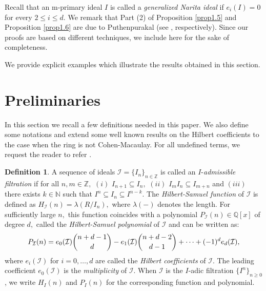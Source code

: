 \documentclass[reqno,a4paper,dvipsnames]{amsart}
\theoremstyle{definition}
\newtheorem{definition}[theorem]{Definition}
\begin{document}
Recall that an m-primary ideal $I$ is called a \textit{generalized Narita ideal} if $e_{i}(I)=0$
 for every $2\leq i\leq d$. We remark that Part (2) of Proposition \ref{prop1.5} and Proposition \ref{prop1.6} are due to Puthenpurakal (see  \cite[Theorem 1.1 (3) and Theorem 1.4]{tjp3}, respectively). Since our proofs are based on different techniques, we include here for the sake of completeness.
 
We provide  explicit examples  which illustrate the  results obtained in  this section.

\section{Preliminaries}  \label{section2}
In this section  we recall  a few definitions needed in this paper. We also define some  notations and extend some well known results on the Hilbert coefficients to the case when  the ring is not Cohen-Macaulay.   For all undefined terms, we request the reader to refer  \cite{bh}.

  \begin{definition} \label{defhilbcoeff1}
       A sequence of ideals $\mathcal{I}=\{I_{n}\}_{n\in \mathbb Z}$ is called an $I$-\textit{admissible filtration} if for all $n, m \in \mathbb Z,$ 
       $(i)$ $I_{n+1} \subseteq I_{n},$ 
       $(ii)$ $I_{m}I_{n} \subseteq I_{m+n}$ and 
       $(iii)$  there exists $k \in \mathbb N$ such that $I^{n} \subseteq I_{n} \subseteq I^{n-k}$. The \textit{Hilbert-Samuel function} of $\mathcal{I}$ is defined as $H_{\mathcal{I}}(n)= \lambda(R/I_{n}),$ where $\lambda(-)$ denotes the length. For sufficiently large  $n,$ this function coincides with  a polynomial $P_{\mathcal{I}}(n) \in \mathbb Q[x]$ of degree $d,$  called the \textit{Hilbert-Samuel polynomial} of $\mathcal{I}$ and can be written  as:
\begin{equation*}
    P_{\mathcal{I}}(n)=e_{0}(\mathcal{I})\dbinom{n+d-1}{d}-e_{1}(\mathcal{I})\dbinom{n+d-2}{d-1}+\cdots+(-1)^{d}e_{d}(\mathcal{I}),
\end{equation*}
where  $e_{i}(\mathcal{I})$ for $i=0,\ldots,d$ are called  the  \textit{Hilbert coefficients} of  $\mathcal{I}$. The leading coefficient $e_{0}(\mathcal{I})$  is  the \textit{multiplicity} of $\mathcal{I}$.
 When $\mathcal{I}$ is the $I$-adic filtration $\{I^{n}\}_{n \geq 0}$, we write $H_{I}(n)$ and $P_{I}(n)$ for the corresponding function and polynomial.
  \end{definition}
\end{document}
